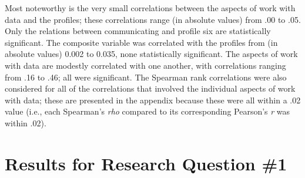 \documentclass[]{book}
\theoremstyle{definition}
\theoremstyle{definition}
\theoremstyle{definition}
\theoremstyle{remark}
\begin{document}
Most noteworthy is the very small correlations between the aspects of
work with data and the profiles; these correlations range (in absolute
values) from .00 to .05. Only the relations between communicating and
profile six are statistically significant. The composite variable was
correlated with the profiles from (in absolute values) 0.002 to 0.035,
none statistically significant. The aspects of work with data are
modestly correlated with one another, with correlations ranging from .16
to .46; all were significant. The Spearman rank correlations were also
considered for all of the correlations that involved the individual
aspects of work with data; these are presented in the appendix because
these were all within a .02 value (i.e., each Spearman's \emph{rho}
compared to its corresponding Pearson's \emph{r} was within .02).

\begin{landscape}\begin{table}

\caption{\label{tab:unnamed-chunk-8}Correlations among study variables}
\centering
{}
\end{table}
\end{landscape}

\section{Results for Research Question
\#1}\label{results-for-research-question-1}
\end{document}
